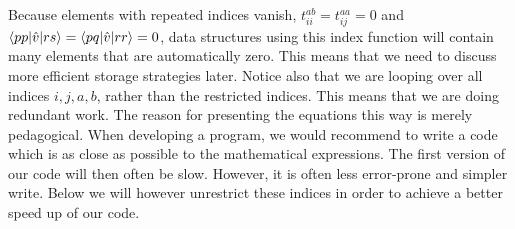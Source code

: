  Because elements with repeated indices vanish,
  $t_{ii}^{ab}=t_{ij}^{aa}=0$ and
  $\braket{pp|\hat{v}|rs}=\braket{pq|\hat{v}|rr}=0$, data structures
  using this index function will contain many elements that are
  automatically zero. This means that we need to discuss more efficient storage
  strategies later. Notice also that we are looping over all
  indices $i,j,a,b$, rather than the restricted indices. This means that we
  are doing redundant work. The reason for presenting the equations this way is merely pedagogical. When developing a program, we would recommend to write a code which is as close as possible to the mathematical expressions. The first version of our code will then often be slow. However, it is often less error-prone and simpler write. 
Below we will however unrestrict these indices in order to achieve a better speed up of our code. 


